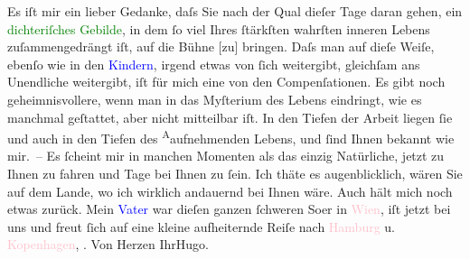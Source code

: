            \pstart
           Es iſt mir ein lieber Gedanke, daſs Sie nach der Qual dieſer Tage daran {\pb}gehen, ein \textcolor{green}{dichteriſches Gebilde}{}, in dem ſo viel Ihres ſtärkſten
               wahrſten inneren Lebens zuſammengedrängt iſt, auf die Bühne {[}zu{]}
               bringen. Daſs man auf dieſe Weiſe, ebenſo wie in den \textcolor{blue}{Kindern}{}, irgend etwas von ſich
               weitergibt, gleichſam ans Unendliche weitergibt, iſt für mich eine von den
               Compenſationen. Es gibt noch geheimnisvollere, wenn man in das Myſterium des Lebens
               eindringt, wie es manchmal geſtattet, aber {\pb}nicht mitteilbar iſt. In den
               Tiefen der Arbeit liegen ſie und auch in den Tiefen des \substVorne{}\textsuperscript{A}\substDazwischen{}a\substHinten{}ufnehmenden Lebens, und ſind Ihnen bekannt wie mir. – Es ſcheint mir in
               manchen Momenten als das einzig Natürliche, jetzt zu Ihnen zu fahren und Tage bei
               Ihnen zu ſein. Ich thäte es augenblicklich, wären Sie auf dem Lande, wo ich wirklich
               andauernd bei Ihnen wäre.\pend
           \pstart
           Auch hält mich noch etwas zurück. Mein \textcolor{blue}{Vater}{} war dieſen ganzen ſchweren So{\geminationm}er in \textcolor{pink}{Wien}{}\ledrightnote{\textcolor{pink}{Wien}},
               iſt jetzt bei uns und freut ſich auf eine kleine aufheiternde Reiſe nach \textcolor{pink}{Hamburg}{}\ledrightnote{\textcolor{pink}{Hamburg}} u. \textcolor{pink}{Kopenhagen}{}\ledrightnote{\textcolor{pink}{Kopenhagen}}, \label{T_L02027_1v}\label{T_L02027_1h}{ }\label{T_L02027_2v}\label{T_L02027_2h}.\pend
           \pstart Von Herzen Ihr\spacefill\mbox{Hugo.}\pend{}\endnumbering{}  
      